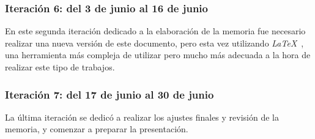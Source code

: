 \subsubsection*{Iteración 6: del 3 de junio al 16 de junio}

En este segunda iteración dedicado a la elaboración de la memoria fue necesario realizar una nueva versión de este
documento, pero esta vez utilizando \textit{LaTeX}~\cite{url_latex}, una herramienta más compleja de utilizar pero
mucho más adecuada a la hora de realizar este tipo de trabajos.

\subsubsection*{Iteración 7: del 17 de junio al 30 de junio}

La última iteración se dedicó a realizar los ajustes finales y revisión de la memoria, y comenzar a preparar la
presentación.

